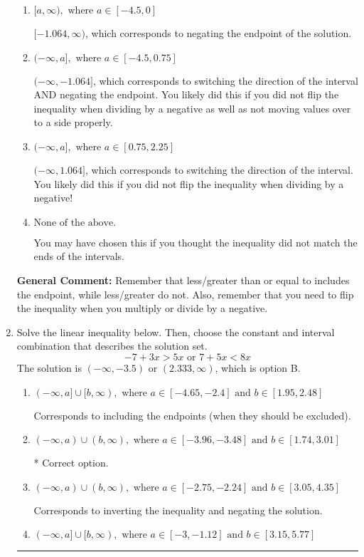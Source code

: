 \documentclass{extbook}[14pt]
\newcommand{\litem}[1]{\item #1

\rule{\textwidth}{0.4pt}}
\begin{document}
\begin{enumerate}
{\begin{enumerate}[label=\Alph*.]
* $[1.064, \infty)$, which is the correct option.
\item \( [a, \infty), \text{ where } a \in [-4.5, 0] \)

 $[-1.064, \infty)$, which corresponds to negating the endpoint of the solution.
\item \( (-\infty, a], \text{ where } a \in [-4.5, 0.75] \)

 $(-\infty, -1.064]$, which corresponds to switching the direction of the interval AND negating the endpoint. You likely did this if you did not flip the inequality when dividing by a negative as well as not moving values over to a side properly.
\item \( (-\infty, a], \text{ where } a \in [0.75, 2.25] \)

 $(-\infty, 1.064]$, which corresponds to switching the direction of the interval. You likely did this if you did not flip the inequality when dividing by a negative!
\item \( \text{None of the above}. \)

You may have chosen this if you thought the inequality did not match the ends of the intervals.
\end{enumerate}

\textbf{General Comment:} Remember that less/greater than or equal to includes the endpoint, while less/greater do not. Also, remember that you need to flip the inequality when you multiply or divide by a negative.
}
\litem{
Solve the linear inequality below. Then, choose the constant and interval combination that describes the solution set.
\[ -7 + 3 x > 5 x \text{ or } 7 + 5 x < 8 x \]The solution is \( (-\infty, -3.5) \text{ or } (2.333, \infty) \), which is option B.\begin{enumerate}[label=\Alph*.]
\item \( (-\infty, a] \cup [b, \infty), \text{ where } a \in [-4.65, -2.4] \text{ and } b \in [1.95, 2.48] \)

Corresponds to including the endpoints (when they should be excluded).
\item \( (-\infty, a) \cup (b, \infty), \text{ where } a \in [-3.96, -3.48] \text{ and } b \in [1.74, 3.01] \)

 * Correct option.
\item \( (-\infty, a) \cup (b, \infty), \text{ where } a \in [-2.75, -2.24] \text{ and } b \in [3.05, 4.35] \)

Corresponds to inverting the inequality and negating the solution.
\item \( (-\infty, a] \cup [b, \infty), \text{ where } a \in [-3, -1.12] \text{ and } b \in [3.15, 5.77] \)


\end{enumerate}}
\end{enumerate}
\end{document}
